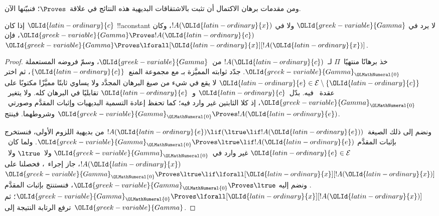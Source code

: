 \documentclass[../../../include/open-logic-section]{subfiles}
\begin{document}


\begin{explain}
  ومن مقدمات برهان الاكتمال أن تثبت بالاشتقاقات البديهية هذه
  النتائج في علاقة~$\Proves$؛ فنبيّنها الآن.
\end{explain}

\begin{thm}
 إذا كان ${\OLId{latin-ordinary}{c}}$ !!a{constant} لا يرد
في ${\OLId{greek-variable}{Gamma}}$ ولا في $!A({\OLId{latin-ordinary}{x}})$، وكان ${\OLId{greek-variable}{Gamma}} \Proves !A({\OLId{latin-ordinary}{c}})$، فإن ${\OLId{greek-variable}{Gamma}}
\Proves \lforall[{\OLId{latin-ordinary}{x}}][!A({\OLId{latin-ordinary}{x}})]$.
\end{thm}

\begin{proof}
خذ برهانًا منتهيًا~$\Pi$ لـ~$!A({\OLId{latin-ordinary}{c}})$ من~${\OLId{greek-variable}{Gamma}}$، وسمّ فروضه المستعملة
${\OLId{greek-variable}{Gamma}}_{\OLMathNumeral{0}}$. جدّد ثوابته المميَّزة بـ
   مع مجموعة المنع~$\{{\OLId{latin-ordinary}{c}}\}$، ثم اختر
${\OLId{latin-ordinary}{e}}\in\mathcal E\setminus\{{\OLId{latin-ordinary}{c}}\}$ لا يقع في شيء من صيغ البرهان المجدَّد ولا يساوي ثابتًا
مميَّزًا مكتوبًا على عقدة~\QR{} فيه. بدّل~${\OLId{latin-ordinary}{c}}$ و~${\OLId{latin-ordinary}{e}}$ تقابليًا في البرهان
كله. ولا يتغير~${\OLId{greek-variable}{Gamma}}_{\OLMathNumeral{0}}$، إذ كلا الثابتين غير وارد فيه؛ كما تحفظ إعادة
التسمية البديهيات وإثبات المقدَّم وصورتي~\QR{} وشروطهما. فينتج
${\OLId{greek-variable}{Gamma}}_{\OLMathNumeral{0}}\Proves !A({\OLId{latin-ordinary}{e}})$.

  ونضم إلى ذلك الصيغة~$!A({\OLId{latin-ordinary}{e}})\lif(\ltrue\lif !A({\OLId{latin-ordinary}{e}}))$ من بديهية اللزوم
  الأولى، فنستخرج بإثبات المقدَّم
  ${\OLId{greek-variable}{Gamma}}_{\OLMathNumeral{0}}\Proves\ltrue\lif !A({\OLId{latin-ordinary}{e}})$. ولما كان~${\OLId{latin-ordinary}{e}}\in\mathcal E$ غير وارد
في~${\OLId{greek-variable}{Gamma}}_{\OLMathNumeral{0}}$ ولا~$\ltrue$ ولا~$!A({\OLId{latin-ordinary}{x}})$، جاز إجراء~\QR{}، فحصلنا على
${\OLId{greek-variable}{Gamma}}_{\OLMathNumeral{0}}\Proves\ltrue\lif\lforall[{\OLId{latin-ordinary}{x}}][!A({\OLId{latin-ordinary}{x}})]$. ونضم إليه
${\OLId{greek-variable}{Gamma}}_{\OLMathNumeral{0}}\Proves\ltrue$، فنستنتج بإثبات المقدَّم
${\OLId{greek-variable}{Gamma}}_{\OLMathNumeral{0}}\Proves\lforall[{\OLId{latin-ordinary}{x}}][!A({\OLId{latin-ordinary}{x}})]$؛ ثم ترفع الرتابة النتيجة إلى~${\OLId{greek-variable}{Gamma}}$.
\end{proof}
\end{document}
